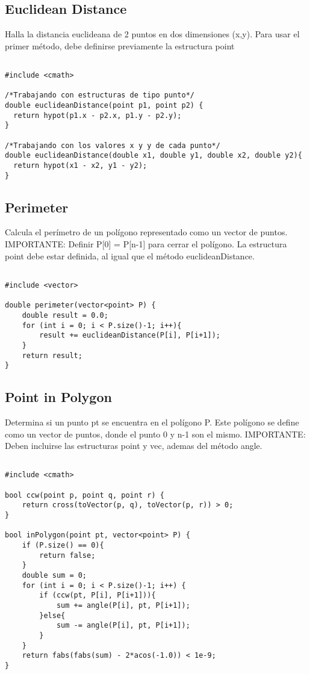 \documentclass[11pt,letterpaper,twocolumn,twosided]{article}
\begin{document}
\subsection{Euclidean Distance}
Halla la distancia euclideana de 2 puntos en dos dimensiones (x,y). Para usar el primer m\'etodo, debe definirse previamente la estructura point
\begin{lstlisting}

#include <cmath>

/*Trabajando con estructuras de tipo punto*/
double euclideanDistance(point p1, point p2) {           
  return hypot(p1.x - p2.x, p1.y - p2.y); 
} 

/*Trabajando con los valores x y y de cada punto*/
double euclideanDistance(double x1, double y1, double x2, double y2){           
  return hypot(x1 - x2, y1 - y2); 
} 
\end{lstlisting}

\subsection{Perimeter}
Calcula el per\'imetro de un pol\'igono representado como un vector de puntos. IMPORTANTE: Definir P[0] = P[n-1] para cerrar el pol\'igono. La estructura point debe estar definida, al igual que el m\'etodo euclideanDistance.
\begin{lstlisting}

#include <vector>

double perimeter(vector<point> P) {
	double result = 0.0;
  	for (int i = 0; i < P.size()-1; i++){
    	result += euclideanDistance(P[i], P[i+1]);
  	}
  	return result; 
}

\end{lstlisting}

\subsection{Point in Polygon}
Determina si un punto pt se encuentra en el pol\'igono P. Este pol\'igono se define como un vector de puntos, donde el punto 0 y n-1 son el mismo. IMPORTANTE: Deben incluirse las estructuras point y vec, ademas del m\'etodo angle.
\begin{lstlisting}

#include <cmath>

bool ccw(point p, point q, point r) {
    return cross(toVector(p, q), toVector(p, r)) > 0; 
}
  
bool inPolygon(point pt, vector<point> P) {
	if (P.size() == 0){
  		return false;
  	} 
  	double sum = 0;    
  	for (int i = 0; i < P.size()-1; i++) {
    	if (ccw(pt, P[i], P[i+1])){
    		sum += angle(P[i], pt, P[i+1]); 
    	}else{
    		sum -= angle(P[i], pt, P[i+1]);
    	}
    }
  	return fabs(fabs(sum) - 2*acos(-1.0)) < 1e-9; 
}
\end{lstlisting}
\end{document}
